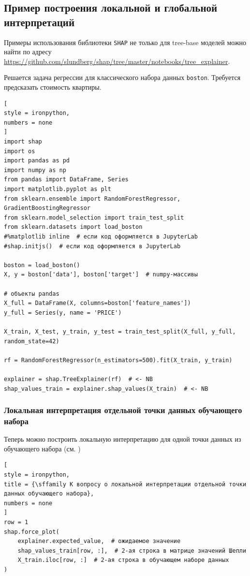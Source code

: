 \documentclass[%
	11pt,
	a4paper,
	utf8,
		]{article}
\begin{document}
\subsection{ Пример построения локальной и глобальной интерпретаций }

Примеры использования библиотеки \texttt{SHAP} не только для tree-base моделей можно найти по адресу \url{https://github.com/slundberg/shap/tree/master/notebooks/tree_explainer}.

Решается задача регрессии для классического набора данных \texttt{boston}. Требуется предсказать стоимость квартиры. 

\begin{lstlisting}[
style = ironpython,
numbers = none
]
import shap
import os
import pandas as pd
import numpy as np
from pandas import DataFrame, Series
import matplotlib.pyplot as plt
from sklearn.ensemble import RandomForestRegressor, GradientBoostingRegressor
from sklearn.model_selection import train_test_split
from sklearn.datasets import load_boston
#%matplotlib inline  # если код оформляется в JupyterLab
#shap.initjs()  # если код оформляется в JupyterLab

boston = load_boston()
X, y = boston['data'], boston['target']  # numpy-массивы

# объекты pandas
X_full = DataFrame(X, columns=boston['feature_names'])
y_full = Series(y, name = 'PRICE')

X_train, X_test, y_train, y_test = train_test_split(X_full, y_full, random_state=42)

rf = RandomForestRegressor(n_estimators=500).fit(X_train, y_train)

explainer = shap.TreeExplainer(rf)  # <- NB
shap_values_train = explainer.shap_values(X_train)  # <- NB
\end{lstlisting}

\subsubsection{Локальная интерпретация отдельной точки данных обучающего набора}

Теперь можно построить локальную интерпретацию для одной точки данных из обучающего набора (см. )

\begin{lstlisting}[
style = ironpython,
title = {\sffamily К вопросу о локальной интерпретации отдельной точки данных обучающего набора},
numbers = none
]
row = 1
shap.force_plot(
    explainer.expected_value,  # ожидаемое значение
    shap_values_train[row, :],  # 2-ая строка в матрице значений Шепли
    X_train.iloc[row, :]  # 2-ая строка в обучающем наборе данных
)
\end{lstlisting}
\end{document}
